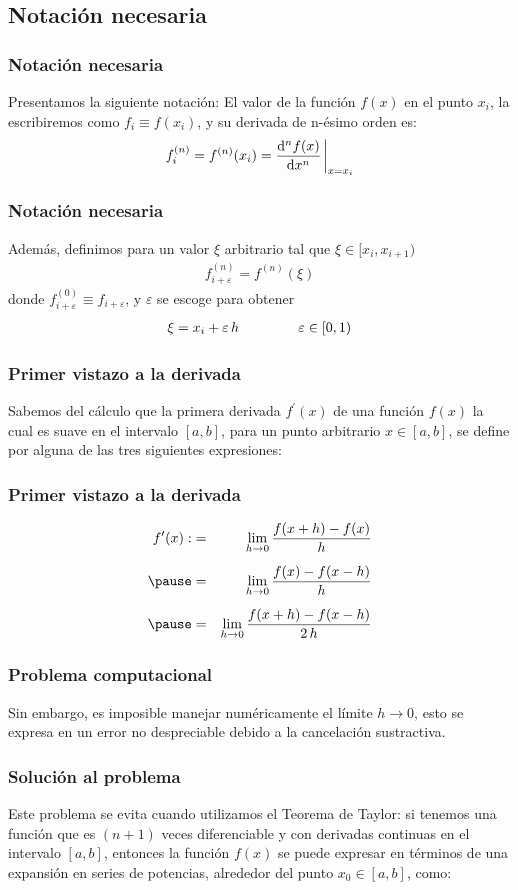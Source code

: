 \subsection{Notación necesaria}
\begin{frame}
\frametitle{Notación necesaria}
Presentamos la siguiente notación: El valor de la función $f(x)$ en el punto $x_{i}$, la escribiremos como $f_{i} \equiv f(x_{i})$, y su derivada de n-ésimo orden es:
\begin{align*}
f_{i}^{(n)} = f^{(n)}(x_{i}) = \dv[n]{f(x)}{x}\eval_{x=x_{i}} 
\end{align*}
\end{frame}
\begin{frame}
\frametitle{Notación necesaria}
Además, definimos para un valor $\xi$ arbitrario tal que $\xi \in [x_{i}, x_{i+1})$
\begin{align*}
f_{i+\varepsilon}^{(n)} = f^{(n)}(\xi)
\end{align*}
\pause
donde $f_{i+\varepsilon}^{(0)} \equiv f_{i+\varepsilon}$, y $\varepsilon$ se escoge para obtener
\begin{align*}
\xi = x_{i} + \varepsilon \, h \hspace{1.5cm} \varepsilon \in [0, 1)
\end{align*}
\end{frame}
\begin{frame}
\frametitle{Primer vistazo a la derivada}
Sabemos del cálculo que la primera derivada $f^{\prime}(x)$ de una función $f(x)$ la cual es suave en el intervalo $[a, b]$, para un punto arbitrario $x \in [a, b]$, se define por alguna de las tres siguientes expresiones:
\end{frame}
\begin{frame}
\frametitle{Primer vistazo a la derivada}
\begin{eqnarray*}
f^{\prime} (x):&=& \lim_{h \to 0} \dfrac{f(x + h) - f(x)}{h} \\[0.5em] \pause
&=& \lim_{h \to 0} \dfrac{f(x) - f(x - h)}{h} \\[0.5em] \pause
&=& \lim_{h \to 0} \dfrac{f(x + h) - f(x - h)}{2 \, h}
\end{eqnarray*}
\end{frame}
\begin{frame}
\frametitle{Problema computacional}
Sin embargo, es imposible manejar numéricamente el límite $h \to 0$, esto se expresa en un error no despreciable debido a la cancelación sustractiva.
\end{frame}
\begin{frame}
\frametitle{Solución al problema}
Este problema se evita cuando utilizamos el Teorema de Taylor: si tenemos una función que es $(n+1)$ veces diferenciable y con derivadas continuas en el intervalo $[a, b]$, entonces la función $f(x)$ se puede expresar en términos de una expansión en series de potencias, alrededor del punto $x_{0} \in [a, b]$, como:
\end{frame}
